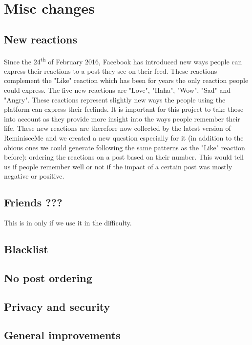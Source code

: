 \chapter{Misc changes}
\section{New reactions}
Since the 24\textsuperscript{th} of February 2016\cite{reactrelease}, Facebook has introduced new ways people can express their reactions to a post they see on their feed. These reactions complement the "Like" reaction which has been for years the only reaction people could express. The five new reactions are "Love", "Haha", "Wow", "Sad" and "Angry". These reactions represent slightly new ways the people using the platform can express their feelinds. It is important for this project to take those into account as they provide more insight into the ways people remember their life. These new reactions are therefore now collected by the latest version of ReminisceMe and we created a new question especially for it (in addition to the obious ones we could generate following the same patterns as the "Like" reaction before): ordering the reactions on a post based on their number. This would tell us if people remember well or not if the impact of a certain post was mostly negative or positive.
\section{Friends ???}
This is in only if we use it in the difficulty.
\section{Blacklist}
\section{No post ordering}
\section{Privacy and security}
\section{General improvements}